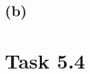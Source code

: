 \documentclass[12pt]{article}
\begin{document}
\subsection*{(b)}

\section*{Task 5.4}

\begin{figure}[h]
  \centering
  \fontsize{7pt}{7pt}\selectfont
  
\end{figure}

\begin{figure}[h]
  \centering
  \fontsize{7pt}{7pt}\selectfont
  
\end{figure}

\begin{figure}[h]
  \centering
  \fontsize{7pt}{7pt}\selectfont
  
\end{figure}
\end{document}

